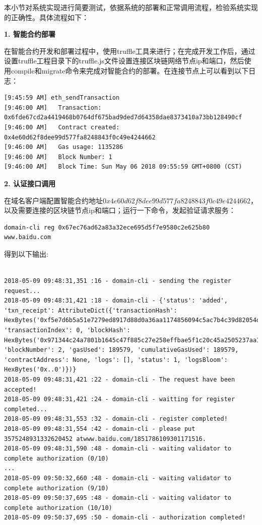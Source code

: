 本小节对系统实现进行简要测试，依据系统的部署和正常调用流程，检验系统实现的正确性。具体流程如下：


\noindent\textbf{1. 智能合约部署}

在智能合约开发和部署过程中，使用truffle工具来进行；在完成开发工作后，通过设置truffle工程目录下的truffle.js文件设置连接区块链网络节点ip和端口，然后使用compile和migrate命令来完成对智能合约的部署。在连接节点上可以看到以下日志：

\begin{lstlisting}[caption={智能合约部署日志}, label=code:deploy]
[9:45:59 AM] eth_sendTransaction
[9:46:00 AM]   Transaction: 0x6fde67cd2a4419468b0764df675bad9ded7d64358dae8373410a73bb128490cf
[9:46:00 AM]   Contract created: 0x4e60d62f8dee99d577fa8248843f0c49e4244662
[9:46:00 AM]   Gas usage: 1135286
[9:46:00 AM]   Block Number: 1
[9:46:00 AM]   Block Time: Sun May 06 2018 09:55:59 GMT+0800 (CST)

\end{lstlisting}

\noindent\textbf{2. 认证接口调用}

在域名客户端配置智能合约地址$0x4e60d62f8dee99d577fa8248843f0c49e4244662$，以及需要连接的区块链节点ip和端口；运行一下命令，发起验证请求服务：

\begin{lstlisting}
domain-cli reg 0x67ec76ad62a83a32ece695d5f7e9580c2e625b80 www.baidu.com
\end{lstlisting}

得到以下输出:

\begin{lstlisting}

2018-05-09 09:48:31,351 :16 - domain-cli - sending the register request...
2018-05-09 09:48:31,421 :18 - domain-cli - {'status': 'added', 'txn_receipt': AttributeDict({'transactionHash': HexBytes('0xf5e7d6b5a51e7279ed8917d88d0a36aa1174856094c5ac7b4c39d82054d05816'), 'transactionIndex': 0, 'blockHash': HexBytes('0x971344c24a7801b1645c47f885c27e258effbae5f1c20c45a2505237aa13dce2'), 'blockNumber': 2, 'gasUsed': 189579, 'cumulativeGasUsed': 189579, 'contractAddress': None, 'logs': [], 'status': 1, 'logsBloom': HexBytes('0x..0')})}
2018-05-09 09:48:31,421 :22 - domain-cli - The request have been accepted!
2018-05-09 09:48:31,421 :24 - domain-cli - waitting for register completed...
2018-05-09 09:48:31,553 :32 - domain-cli - register completed!
2018-05-09 09:48:31,554 :42 - domain-cli - please put 3575248931332620452 atwww.baidu.com/1851786109301171516.
2018-05-09 09:48:31,590 :48 - domain-cli - waiting validator to complete authorization (0/10)
...
2018-05-09 09:50:32,660 :48 - domain-cli - waiting validator to complete authorization (9/10)
2018-05-09 09:50:37,695 :48 - domain-cli - waiting validator to complete authorization (10/10)
2018-05-09 09:50:37,695 :50 - domain-cli - authorization completed!
 \end{lstlisting}

